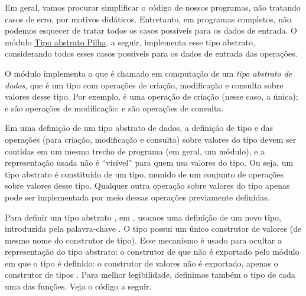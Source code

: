 Em geral, vamos procurar simplificar o código de nossos programas, não
tratando casos de erro, por motivos didáticos. Entretanto, em
programas completos, não podemos esquecer de tratar todos os casos
possíveis para os dados de entrada. O módulo \href{figPilha}{Tipo
  abstrato Pilha}, a seguir, implementa esse tipo abstrato,
considerando todos esses casos possíveis para os dados de entrada das
operações.

O módulo  implementa o que é chamado em computação de um
{\em tipo abstrato de dados\/}, que é um tipo com operações de
criação, modificação e consulta sobre valores desse tipo. Por exemplo,
 é uma operação de criação (nesse caso, a única);
 e  são operações de modificação;
 e  são operações de consulta.

Em uma definição de um tipo abstrato de dados, a definição de tipo e
das operações (para criação, modificação e consulta) sobre valores do
tipo devem ser contidas em um mesmo trecho de programa (em geral, um
módulo), e a representação usada não é ``visível'' para quem usa
valores do tipo. Ou seja, um tipo abstrato é constituído de um tipo,
munido de um conjunto de operações sobre valores desse tipo. Qualquer
outra operação sobre valores do tipo apenas pode ser implementada por
meio dessas operações previamente definidas.

Para definir um tipo abstrato , em \Haskell, usamos uma
definição de um novo tipo, introduzida pela palavra-chave
. O tipo  possui um único construtor de
valores  (de mesmo nome do construtor de tipo). Esse
mecanismo é usado para ocultar a representação do tipo abstrato: o
construtor de que não é exportado pelo módulo em que o tipo é
definido: o construtor de valores  não é exportado,
apenas o construtor de tipos . Para melhor legibilidade,
definimos também o tipo de cada uma das funções. Veja o código a
seguir.  

